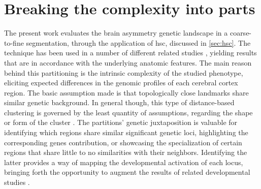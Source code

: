 \section{Breaking the complexity into parts}
The present work evaluates the brain asymmetry genetic landscape in a coarse-to-fine segmentation, through the application of \ac{hsc}\cite{Ng2002}, discussed in \autoref{sec:hsc}. The technique has been used in a number of different related studies \cite{Claes2018}\cite{Naqvi2021}, yielding results that are in accordance with the underlying anatomic features. The main reason behind this partitioning is the intrinsic complexity of the studied phenotype, eliciting expected differences in the genomic profiles of each cerebral cortex region. The basic assumption made is that topologically close landmarks share similar genetic background. In general though, this type of distance-based clustering is governed by the least quantity of assumptions, regarding the shape or form of the cluster \cite{VonLuxburg2007}. The partitions' genetic juxtaposition is valuable for identifying which regions share similar significant genetic loci, highlighting the corresponding genes contribution, or showcasing the specialization of certain regions that share little to no similarities with their neighbors. Identifying the latter provides a way of mapping the developmental activation of each locus, bringing forth the opportunity to augment the results of related developmental studies \cite{Vijayakumar2016}.

